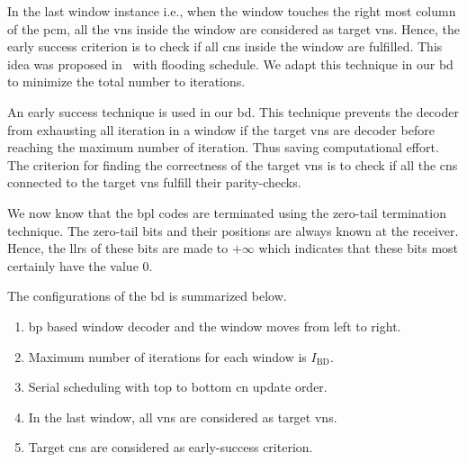 In the last window instance i.e., when the window touches the right most column of the \gls{pcm}, all the \glspl{vn} inside the window are considered as target \glspl{vn}. Hence, the early success criterion is to check if all \glspl{cn} inside the window are fulfilled. This idea was proposed in~\cite{Ali2018} with flooding schedule. We adapt this technique in our \gls{bd} to minimize the total number to iterations.

An early success technique is used in our \gls{bd}. This technique prevents the decoder from exhausting all iteration in a window if the target \glspl{vn} are decoder before reaching the maximum number of iteration. Thus saving computational effort. The criterion for finding the correctness of the target \glspl{vn} is to check if all the \glspl{cn} connected to the target \glspl{vn} fulfill their parity-checks.

We now know that the \gls{bpl} codes are terminated using the zero-tail termination technique. The zero-tail bits and their positions are always known at the receiver. Hence, the \glspl{llr} of these bits are made to $+\infty$ which indicates that these bits most certainly have the value 0.

The configurations of the \gls{bd} is summarized below.
\begin{enumerate}
  \item \gls{bp} based window decoder and the window moves from left to right.
  \item Maximum number of iterations for each window is $I_{\text{BD}}$.
  \item Serial scheduling with top to bottom \gls{cn} update order.
  \item In the last window, all \glspl{vn} are considered as target \glspl{vn}.
  \item Target \glspl{cn} are considered as early-success criterion.
\end{enumerate}

